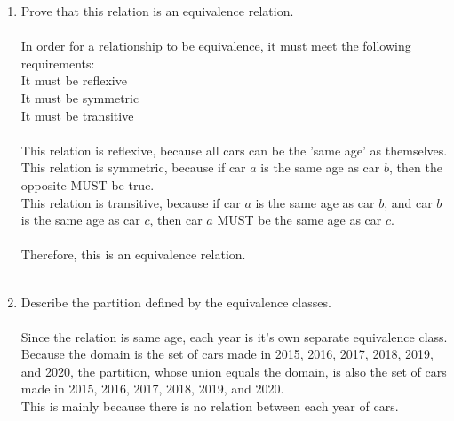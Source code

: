 \documentclass{amsart}
\theoremstyle{definition}
\theoremstyle{Exercise}
\theoremstyle{remark}
\theoremstyle{rule}
\numberwithin{equation}{section}
\begin{document}
  \begin{enumerate}[label=(\alph*)]
    \item Prove that this relation is an equivalence relation.
\\\\
  In order for a relationship to be equivalence, it must meet the following requirements:\\
  It must be reflexive\\
  It must be symmetric\\
  It must be transitive\\
  \\
  This relation is reflexive, because all cars can be the 'same age' as themselves.\\
  This relation is symmetric, because if car $a$ is the same age as car $b$, then the opposite MUST be true.\\
  This relation is transitive, because if car $a$ is the same age as car $b$, and car $b$ is the same age as car $c$, then car $a$ MUST be the same age as car $c$.\\
  \\
  Therefore, this is an equivalence relation.
  \\\\
    \item Describe the partition defined by the equivalence classes.
\\\\
  Since the relation is same age, each year is it's own separate equivalence class.\\
  Because the domain is the set of cars made in 2015, 2016, 2017, 2018, 2019, and 2020, the partition, whose union equals the domain, is also the set of cars made in 2015, 2016, 2017, 2018, 2019, and 2020.\\
  This is mainly because there is no relation between each year of cars.
\\\\
  \end{enumerate}
\newpage
\end{document}
